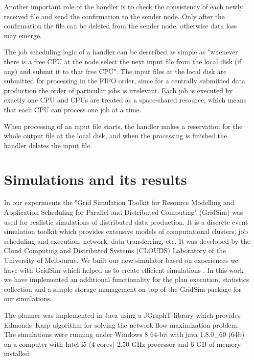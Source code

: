 \documentclass{svjour3}                     %
\begin{document}
Another important role of the handler is to check the consistency of each newly received file and send the confirmation to the sender node. Only after the confirmation the file can be deleted from the sender node, otherwise data loss may emerge. 

The job scheduling logic of a handler can be described as simple as "whenever there is a free CPU at the node select the next input file from the local disk (if any) and submit it to that free CPU". The input files at the local disk are submitted for processing in the FIFO order, since for a centrally submitted data production the order of particular jobs is irrelevant. Each job is executed by exactly one CPU and CPUs are treated as a space-shared resource, which means that each CPU can process one job at a time.

When processing of an input file starts, the handler makes a reservation for the whole output file at the local disk, and when the processing is finished the handler deletes the input file.

\section{Simulations and its results}
\label{simulations}
In our experiments the "Grid Simulation Toolkit for Resource Modelling and Application Scheduling for Parallel and Distributed Computing" (GridSim) \cite{GridSim} was used for realistic simulations of distributed data production. It is a discrete event simulation toolkit which provides extensive models of computational clusters, job scheduling and execution, network, data transferring, etc. It was developed by the Cloud Computing and Distributed Systems (CLOUDS) Laboratory of the University of Melbourne. We built our new simulator based on experiences we have with GridSim which helped us to create efficient simulations \cite{alea2}. In this work we have implemented an additional functionality for the plan execution, statistics collection and a simple storage management   on top of the GridSim package for our simulations.

The planner was implemented in Java using a JGraphT \cite{JGraphT} library which provides Edmonds–Karp algorithm \cite{Network_flows} for solving the network flow maximization problem. The simulations were running under Windows 8 64-bit with java 1.8.0\_60 (64b) on a computer with Intel i5 (4 cores) 2.50 GHz processor and 6 GB of memory installed. 
\end{document}
